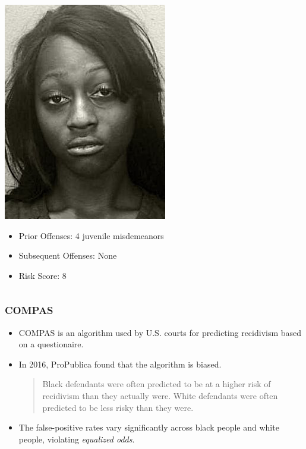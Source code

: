 \documentclass{beamer}
\begin{document}
\begin{frame}
\begin{columns}[T]
\begin{column}{.5\textwidth}
            \centering
            \includegraphics[width=.5\textwidth]{BORDEN.jpg}
            \footnotesize
            \begin{itemize}
                \item Prior Offenses: 4 juvenile misdemeanors
                \item Subsequent Offenses: None
                \item Risk Score: 8
            \end{itemize}
        \end{column}
    \end{columns}
\end{frame}

\begin{frame}
    \frametitle{COMPAS}
    \begin{itemize}
        \item COMPAS is an algorithm
        used by U.S. courts for predicting recidivism based on a
        questionaire.
        \item In 2016, ProPublica found that the algorithm is biased.
        \begin{quote}
            Black defendants were often predicted to be at a higher risk of recidivism than they actually were.
            White defendants were often predicted to be less risky than they were.
        \end{quote}
        \item The false-positive rates vary significantly across
        black people and white people, violating \textit{equalized odds}.
    \end{itemize}
\end{frame}
\end{document}
